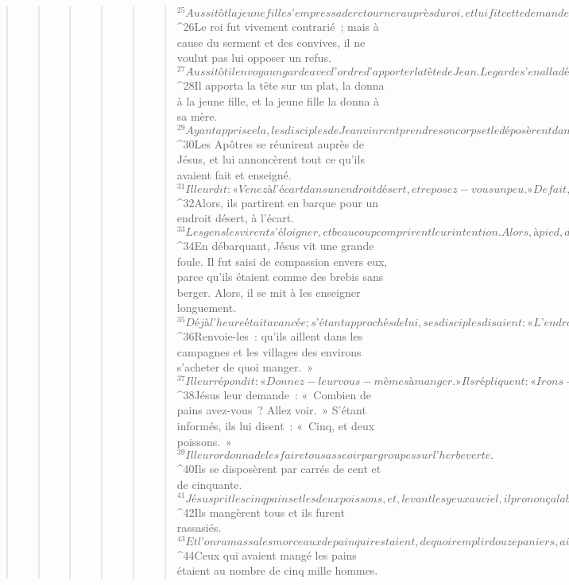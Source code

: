 \begin{verse}
\begin{verse}
\begin{verse}
\begin{verse}
\begin{verse}
\begin{verse}
${}^{25}Aussitôt la jeune fille s’empressa de retourner auprès du roi, et lui fit cette demande : « Je veux que, tout de suite, tu me donnes sur un plat la tête de Jean le Baptiste. » 
${}^{26}Le roi fut vivement contrarié ; mais à cause du serment et des convives, il ne voulut pas lui opposer un refus. 
${}^{27}Aussitôt il envoya un garde avec l’ordre d’apporter la tête de Jean. Le garde s’en alla décapiter Jean dans la prison. 
${}^{28}Il apporta la tête sur un plat, la donna à la jeune fille, et la jeune fille la donna à sa mère. 
${}^{29}Ayant appris cela, les disciples de Jean vinrent prendre son corps et le déposèrent dans un tombeau.
${}^{30}Les Apôtres se réunirent auprès de Jésus, et lui annoncèrent tout ce qu’ils avaient fait et enseigné. 
${}^{31}Il leur dit : « Venez à l’écart dans un endroit désert, et reposez-vous un peu. »
      De fait, ceux qui arrivaient et ceux qui partaient étaient nombreux, et l’on n’avait même pas le temps de manger. 
${}^{32}Alors, ils partirent en barque pour un endroit désert, à l’écart. 
${}^{33}Les gens les virent s’éloigner, et beaucoup comprirent leur intention. Alors, à pied, de toutes les villes, ils coururent là-bas et arrivèrent avant eux.
${}^{34}En débarquant, Jésus vit une grande foule. Il fut saisi de compassion envers eux, parce qu’ils étaient comme des brebis sans berger. Alors, il se mit à les enseigner longuement.
${}^{35}Déjà l’heure était avancée ; s’étant approchés de lui, ses disciples disaient : « L’endroit est désert et déjà l’heure est tardive. 
${}^{36}Renvoie-les : qu’ils aillent dans les campagnes et les villages des environs s’acheter de quoi manger. » 
${}^{37}Il leur répondit : « Donnez-leur vous-mêmes à manger. » Ils répliquent : « Irons-nous dépenser le salaire de deux cents journées pour acheter des pains et leur donner à manger ? » 
${}^{38}Jésus leur demande : « Combien de pains avez-vous ? Allez voir. » S’étant informés, ils lui disent : « Cinq, et deux poissons. »
${}^{39}Il leur ordonna de les faire tous asseoir par groupes sur l’herbe verte. 
${}^{40}Ils se disposèrent par carrés de cent et de cinquante. 
${}^{41}Jésus prit les cinq pains et les deux poissons, et, levant les yeux au ciel, il prononça la bénédiction et rompit les pains ; il les donnait aux disciples pour qu’ils les distribuent à la foule. Il partagea aussi les deux poissons entre eux tous. 
${}^{42}Ils mangèrent tous et ils furent rassasiés. 
${}^{43}Et l’on ramassa les morceaux de pain qui restaient, de quoi remplir douze paniers, ainsi que les restes des poissons. 
${}^{44}Ceux qui avaient mangé les pains étaient au nombre de cinq mille hommes.

\end{verse}
\end{verse}
\end{verse}
\end{verse}
\end{verse}
\end{verse}
